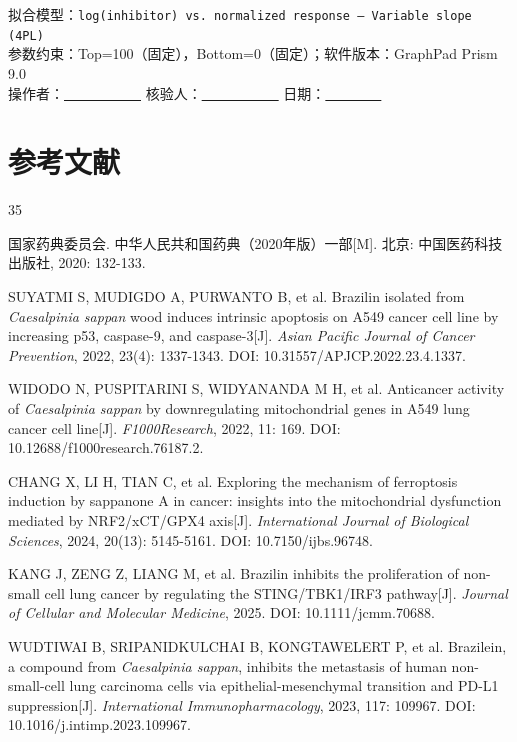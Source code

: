 \documentclass[12pt,a4paper]{article}
\begin{document}
拟合模型：\texttt{log(inhibitor) vs. normalized response -- Variable slope (4PL)}\\
参数约束：Top=100（固定），Bottom=0（固定）；软件版本：GraphPad Prism 9.0\\
操作者：\underline{\ \ \ \ \ \ \ \ \ \ \ } \quad 核验人：\underline{\ \ \ \ \ \ \ \ \ \ \ } \quad 日期：\underline{\ \ \ \ \ \ \ \ }

\clearpage
\section*{参考文献}

{\small
\begin{thebibliography}{35}
\setlength{\itemsep}{2pt}

 国家药典委员会. 中华人民共和国药典（2020年版）一部[M]. 北京: 中国医药科技出版社, 2020: 132-133.

 SUYATMI S, MUDIGDO A, PURWANTO B, et al. Brazilin isolated from \textit{Caesalpinia sappan} wood induces intrinsic apoptosis on A549 cancer cell line by increasing p53, caspase-9, and caspase-3[J]. \textit{Asian Pacific Journal of Cancer Prevention}, 2022, 23(4): 1337-1343. DOI: 10.31557/APJCP.2022.23.4.1337.

 WIDODO N, PUSPITARINI S, WIDYANANDA M H, et al. Anticancer activity of \textit{Caesalpinia sappan} by downregulating mitochondrial genes in A549 lung cancer cell line[J]. \textit{F1000Research}, 2022, 11: 169. DOI: 10.12688/f1000research.76187.2.

 CHANG X, LI H, TIAN C, et al. Exploring the mechanism of ferroptosis induction by sappanone A in cancer: insights into the mitochondrial dysfunction mediated by NRF2/xCT/GPX4 axis[J]. \textit{International Journal of Biological Sciences}, 2024, 20(13): 5145-5161. DOI: 10.7150/ijbs.96748.

 KANG J, ZENG Z, LIANG M, et al. Brazilin inhibits the proliferation of non-small cell lung cancer by regulating the STING/TBK1/IRF3 pathway[J]. \textit{Journal of Cellular and Molecular Medicine}, 2025. DOI: 10.1111/jcmm.70688.

 WUDTIWAI B, SRIPANIDKULCHAI B, KONGTAWELERT P, et al. Brazilein, a compound from \textit{Caesalpinia sappan}, inhibits the metastasis of human non-small-cell lung carcinoma cells via epithelial-mesenchymal transition and PD-L1 suppression[J]. \textit{International Immunopharmacology}, 2023, 117: 109967. DOI: 10.1016/j.intimp.2023.109967.


\end{thebibliography}}
\end{document}
